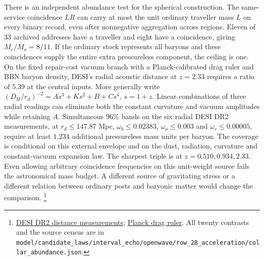 \documentclass[11pt]{article}
\begin{document}
There is an independent abundance test for the spherical construction.
The same-service coincidence $LR$ can carry at most the unit ordinary
traveller mass $L$ on every binary record, even after nonnegative
aggregation across regions. Eleven of 33 archived addresses have a
traveller and eight have a coincidence, giving $M_c/M_o=8/11$.
If the ordinary stock represents all baryons and these coincidences
supply the entire extra pressureless component, the ceiling is one.
On the fixed repair-cost vacuum branch with a Planck-calibrated drag
ruler and BBN baryon density, DESI's radial acoustic distance at
$z=2.33$ requires a ratio of $5.39$ at the central inputs. More
generally write $(D_H/r_d)^{-2}=A s^3+K s^2+B+C s^4$, $s=1+z$.
Linear combinations of three radial readings can eliminate both
the constant curvature and vacuum amplitudes while retaining $A$.
Simultaneous 96\% bands on the six radial DESI DR2 measurements, at
$r_d\le147.87$ Mpc, $\omega_b\le0.02383$, $\omega_\nu\le0.003$
and $\omega_r\le0.00005$, require at least $1.234$ additional
pressureless mass units per baryon. The coverage is conditional on
this external envelope and on the dust, radiation, curvature and
constant-vacuum expansion law. The sharpest triple is at
$z=0.510,0.934,2.33$. Even allowing arbitrary coincidence frequencies
on this unit-weight source fails the astronomical mass budget. A
different source of gravitating stress or a different relation between
ordinary posts and baryonic matter would change the comparison.%
\footnote{\href{https://arxiv.org/abs/2503.14738}{DESI DR2 distance measurements};
\href{https://arxiv.org/abs/1807.06209}{Planck drag ruler}.
All twenty contrasts and the source census are in
\nolinkurl{model/candidate_laws/interval_echo/openwave/row_28_acceleration/collar_abundance.json}.}
\end{document}
